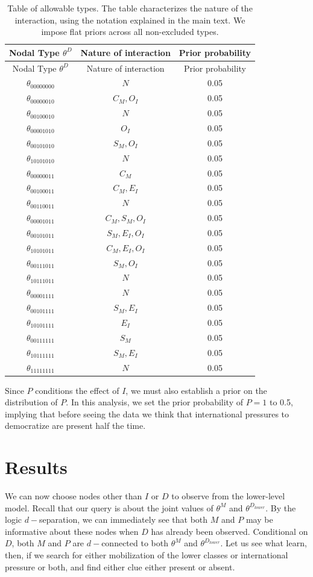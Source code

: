\documentclass[
  12pt,
]{book}
\begin{document}
\begin{longtable}[]{@{}ccc@{}}
\caption{\label{tab:apptypes2} Table of allowable types. The table characterizes the nature of the interaction, using the notation explained in the main text. We impose flat priors across all non-excluded types.}\tabularnewline
\toprule
Nodal Type \(\theta^D\) & Nature of interaction & Prior probability\tabularnewline
\midrule
\endfirsthead
\toprule
Nodal Type \(\theta^D\) & Nature of interaction & Prior probability\tabularnewline
\midrule
\endhead
\(\theta_{00000000}\) & \(N\) & 0.05\tabularnewline
\(\theta_{00000010}\) & \(C_M, O_I\) & 0.05\tabularnewline
\(\theta_{00100010}\) & \(N\) & 0.05\tabularnewline
\(\theta_{00001010}\) & \(O_I\) & 0.05\tabularnewline
\(\theta_{00101010}\) & \(S_M, O_I\) & 0.05\tabularnewline
\(\theta_{10101010}\) & \(N\) & 0.05\tabularnewline
\(\theta_{00000011}\) & \(C_M\) & 0.05\tabularnewline
\(\theta_{00100011}\) & \(C_M, E_I\) & 0.05\tabularnewline
\(\theta_{00110011}\) & \(N\) & 0.05\tabularnewline
\(\theta_{00001011}\) & \(C_M, S_M, O_I\) & 0.05\tabularnewline
\(\theta_{00101011}\) & \(S_M, E_I, O_I\) & 0.05\tabularnewline
\(\theta_{10101011}\) & \(C_M, E_I, O_I\) & 0.05\tabularnewline
\(\theta_{00111011}\) & \(S_M, O_I\) & 0.05\tabularnewline
\(\theta_{10111011}\) & \(N\) & 0.05\tabularnewline
\(\theta_{00001111}\) & \(N\) & 0.05\tabularnewline
\(\theta_{00101111}\) & \(S_M, E_I\) & 0.05\tabularnewline
\(\theta_{10101111}\) & \(E_I\) & 0.05\tabularnewline
\(\theta_{00111111}\) & \(S_M\) & 0.05\tabularnewline
\(\theta_{10111111}\) & \(S_M, E_I\) & 0.05\tabularnewline
\(\theta_{11111111}\) & \(N\) & 0.05\tabularnewline
\bottomrule
\end{longtable}

Since \(P\) conditions the effect of \(I\), we must also establish a prior on the distribution of \(P\). In this analysis, we set the prior probability of \(P=1\) to 0.5, implying that before seeing the data we think that international pressures to democratize are present half the time.

\hypertarget{results}{%
\section{Results}\label{results}}

We can now choose nodes other than \(I\) or \(D\) to observe from the lower-level model. Recall that our query is about the joint values of \(\theta^M\) and \(\theta^{D_{lower}}\). By the logic \(d-\)separation, we can immediately see that both \(M\) and \(P\) may be informative about these nodes when \(D\) has already been observed. Conditional on \(D\), both \(M\) and \(P\) are \(d-\)connected to both \(\theta^M\) and \(\theta^{D_{lower}}\). Let us see what learn, then, if we search for either mobilization of the lower classes or international pressure or both, and find either clue either present or absent.
\end{document}
